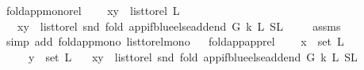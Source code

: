\begin{isabellebody}
\isamarkupfalse%
%
\endisatagproof
{\isafoldproof}%
%
\isadelimproof
\isanewline
%
\endisadelimproof
\isanewline
{}\isamarkupfalse%
\ fold{\isacharunderscore}{\kern0pt}app{\isacharunderscore}{\kern0pt}mono{\isacharunderscore}{\kern0pt}rel{}{\isacharcolon}{\kern0pt}\ \isanewline
\ \ \ {\isachardoublequoteopen}{\isacharparenleft}{\kern0pt}x{\isacharcomma}{\kern0pt}y{\isacharparenright}{\kern0pt}\ {\isasymin}\ list{\isacharunderscore}{\kern0pt}to{\isacharunderscore}{\kern0pt}rel\ L{}{\isachardoublequoteclose}\isanewline
\ \ \ {\isachardoublequoteopen}{\isacharparenleft}{\kern0pt}x{\isacharcomma}{\kern0pt}y{\isacharparenright}{\kern0pt}\ {\isasymin}\ list{\isacharunderscore}{\kern0pt}to{\isacharunderscore}{\kern0pt}rel\ {\isacharparenleft}{\kern0pt}snd\ {\isacharparenleft}{\kern0pt}fold\ {\isacharparenleft}{\kern0pt}app{\isacharunderscore}{\kern0pt}if{\isacharunderscore}{\kern0pt}blue{\isacharunderscore}{\kern0pt}else{\isacharunderscore}{\kern0pt}add{\isacharunderscore}{\kern0pt}end\ G\ k{\isacharparenright}{\kern0pt}\ L{}\ {\isacharparenleft}{\kern0pt}S{\isacharcomma}{\kern0pt}L{}{\isacharparenright}{\kern0pt}{\isacharparenright}{\kern0pt}{\isacharparenright}{\kern0pt}{\isachardoublequoteclose}\ \isanewline
%
\isadelimproof
\ \ %
\endisadelimproof
%
\isatagproof
{}\isamarkupfalse%
\ assms\isanewline
\ \ \isamarkupfalse%
\ {\isacharparenleft}{\kern0pt}simp\ add{\isacharcolon}{\kern0pt}\ fold{\isacharunderscore}{\kern0pt}app{\isacharunderscore}{\kern0pt}mono\ list{\isacharunderscore}{\kern0pt}to{\isacharunderscore}{\kern0pt}rel{\isacharunderscore}{\kern0pt}mono{}{\isacharparenright}{\kern0pt}%
\endisatagproof
{\isafoldproof}%
%
\isadelimproof
\ \isanewline
%
\endisadelimproof
\isanewline
{}\isamarkupfalse%
\ fold{\isacharunderscore}{\kern0pt}app{\isacharunderscore}{\kern0pt}app{\isacharunderscore}{\kern0pt}rel{\isacharcolon}{\kern0pt}\ \isanewline
\ \ \ {\isachardoublequoteopen}x\ {\isasymin}\ set\ L{}{\isachardoublequoteclose}\isanewline
\ \ \ \ \ {\isachardoublequoteopen}y\ {\isasymin}\ set\ L{}{\isachardoublequoteclose}\isanewline
\ \ \ {\isachardoublequoteopen}{\isacharparenleft}{\kern0pt}x{\isacharcomma}{\kern0pt}y{\isacharparenright}{\kern0pt}\ {\isasymin}\ list{\isacharunderscore}{\kern0pt}to{\isacharunderscore}{\kern0pt}rel\ {\isacharparenleft}{\kern0pt}snd\ {\isacharparenleft}{\kern0pt}fold\ {\isacharparenleft}{\kern0pt}app{\isacharunderscore}{\kern0pt}if{\isacharunderscore}{\kern0pt}blue{\isacharunderscore}{\kern0pt}else{\isacharunderscore}{\kern0pt}add{\isacharunderscore}{\kern0pt}end\ G\ k{\isacharparenright}{\kern0pt}\ L{}\ {\isacharparenleft}{\kern0pt}S{\isacharcomma}{\kern0pt}L{}{\isacharparenright}{\kern0pt}{\isacharparenright}{\kern0pt}{\isacharparenright}{\kern0pt}{\isachardoublequoteclose}\ \isanewline

\end{isabellebody}

